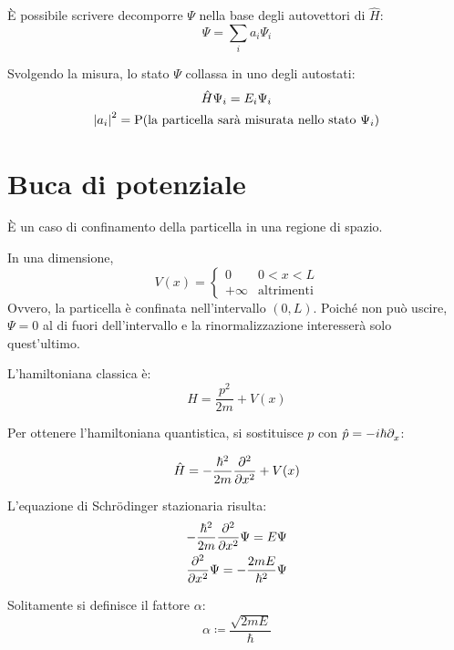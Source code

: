 È possibile scrivere decomporre $\Psi$ nella base degli autovettori di $\hat{H}$:
\begin{equation}
    \Psi = \sum_i a_i \Psi_i
\end{equation}

Svolgendo la misura, lo stato $\Psi	$ collassa in uno degli autostati:
\begin{gather}
    \hat{H} \Psi_i = E_i \Psi_i \\
    \left\lvert a_i \right\rvert^2 = \mathrm{P}(\text{la particella sarà misurata nello stato $\Psi_i$})
\end{gather}

\section{Buca di potenziale}

È un caso di confinamento della particella in una regione di spazio.

In una dimensione,
\begin{equation}
    V(x) = \begin{cases}
        0 & 0 < x < L \\
        +\infty & \text{altrimenti}
    \end{cases}
\end{equation}
Ovvero, la particella è confinata nell'intervallo $(0, L)$.
Poiché non può uscire, $\Psi = 0$ al di fuori dell'intervallo e la rinormalizzazione interesserà solo quest'ultimo.

L'hamiltoniana classica è:
\begin{equation}
    H = \frac{p^2}{2 m} + V(x)
\end{equation}

Per ottenere l'hamiltoniana quantistica, si sostituisce $p$ con $\hat{p} = -\im \hbar \parder{x}$:

\begin{equation}
    \hat{H} = -\frac{\hbar^2}{2 m} \parder[][2]{x} + V(x)
\end{equation}

L'equazione di Schrödinger stazionaria risulta:
\begin{gather}
    -\frac{\hbar^2}{2 m} \parder[][2]{x} \Psi = E \Psi \\
    \parder[][2]{x} \Psi = -\frac{2 m E}{\hbar^2} \Psi
\end{gather}

Solitamente si definisce il fattore $\alpha$:
\begin{equation}
    \alpha \coloneq \frac{\sqrt{2 m E}}{\hbar}
\end{equation}

